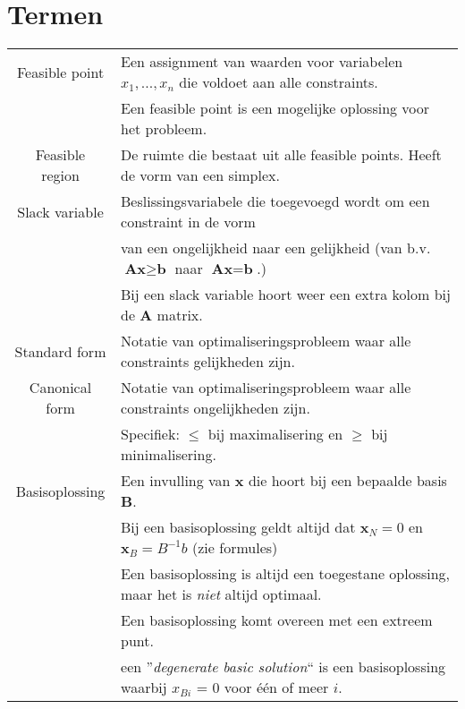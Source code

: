 \documentclass[10pt,a4paper]{article}
\begin{document}
\newpage
\section*{Termen}
\begin{tabular}{|c|l|}
\hline
Feasible point & Een assignment van waarden voor variabelen $x_1, ..., x_n$ die voldoet aan alle constraints. \\ 
& Een feasible point is een mogelijke oplossing voor het probleem.\\
\hline
Feasible region & De ruimte die bestaat uit alle feasible points. Heeft de vorm van een simplex. \\
\hline
Slack variable & Beslissingsvariabele die toegevoegd wordt om een constraint in de vorm \\ &van een ongelijkheid naar een gelijkheid (van b.v. $\textbf{Ax} \geq \textbf{b}$ naar $\textbf{Ax} = \textbf{b}$.)\\
& Bij een slack variable hoort weer een extra kolom bij de $\textbf{A}$ matrix. \\
\hline
Standard form & Notatie van optimaliseringsprobleem waar alle constraints gelijkheden zijn.\\
\hline
Canonical form & Notatie van optimaliseringsprobleem waar alle constraints ongelijkheden zijn.\\
 & Specifiek: $\le$ bij maximalisering en $\geq$ bij minimalisering. \\
\hline
Basisoplossing & Een invulling van $\textbf{x}$ die hoort bij een bepaalde basis $\textbf{B}$. \\
 & Bij een basisoplossing geldt altijd dat $\textbf{x}_N = 0$ en $\textbf{x}_B = B^{-1}b$ (zie formules) \\
 & Een basisoplossing is altijd een toegestane oplossing, maar het is \textit{niet} altijd optimaal. \\
 & Een basisoplossing komt overeen met een extreem punt. \\
 & een ''\textit{degenerate basic solution}`` is een basisoplossing waarbij $x_{Bi}$ = 0 voor één of meer $i$. \\
\hline
\end{tabular} 
\end{document}

